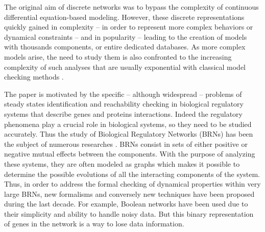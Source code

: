
The original aim of discrete networks \cite{kauffman69,Thomas73} was to bypass the complexity of
continuous differential equation-based modeling.
However, these discrete representations quickly gained in complexity -- in order to represent more complex behaviors or dynamical constraints --
and in popularity -- leading to the creation of models with thousands components, or entire dedicated databases.
As more complex models arise, the need to study them is also confronted to the increasing complexity of such analyses
that are usually exponential with classical model checking methods \cite{Harel02}.

The paper is motivated by the specific -- although widespread -- problems of steady states identification and reachability checking in biological regulatory systems that describe genes and proteins interactions. Indeed the regulatory phenomena play a crucial role in biological systems, so they need to be studied accurately. Thus the study of Biological Regulatory Networks (BRNs) has been the subject of numerous researches \cite{thieffry1999modularity, shermin20092, rauf2011formal}. BRNs consist in sets of either positive or negative mutual effects between the components. With the purpose of analyzing these systems, they are often modeled as graphs which makes it possible to determine the possible evolutions of all the interacting components of the system. Thus, in order to address the formal checking of dynamical properties within very large BRNs, new formalisms and conversely new techniques have been proposed during the last decade. For example, Boolean networks \cite{stuart1993origins, kauffman1969metabolic} have been used due to their simplicity and ability to handle noisy data. But this binary representation of genes in the network is a way to lose data information. %

